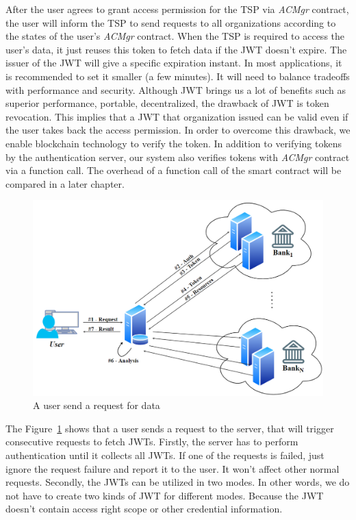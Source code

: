 After the user agrees to grant access permission for the TSP via \textit{ACMgr} contract, the user will inform the TSP to send requests to all organizations according to the states of the user's \textit{ACMgr} contract. When the TSP is required to access the user's data, it just reuses this token to fetch data if the JWT doesn't expire. The issuer of the JWT will give a specific expiration instant. In most applications, it is recommended to set it smaller (a few minutes). It will need to balance tradeoffs with performance and security. Although JWT brings us a lot of benefits such as superior performance, portable, decentralized, the drawback of JWT is token revocation. This implies that a JWT that organization issued can be valid even if the user takes back the access permission. In order to overcome this drawback, we enable blockchain technology to verify the token. In addition to verifying tokens by the authentication server, our system also verifies tokens with \textit{ACMgr} contract via a function call. The overhead of a function call of the smart contract will be compared in a later chapter.\par
\newpage
\begin{figure}[htb]
    \centering
    \includegraphics[height=!,width=1\linewidth,keepaspectratio=true]{figures/jwt_flow.png}
    \caption{{\footnotesize A user send a request for data}}
    \label{fig:jwt_flow}
\end{figure}
The Figure~\ref{fig:jwt_flow} shows that a user sends a request to the server, that will trigger consecutive requests to fetch JWTs. Firstly, the server has to perform authentication until it collects all JWTs. If one of the requests is failed, just ignore the request failure and report it to the user. It won't affect other normal requests. Secondly, the JWTs can be utilized in two modes. In other words, we do not have to create two kinds of JWT for different modes. Because the JWT doesn't contain access right scope or other credential information. 
